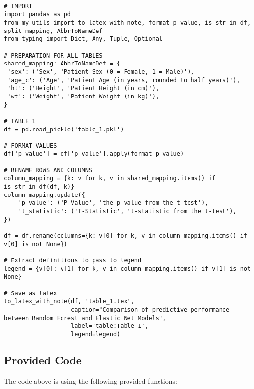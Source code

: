 \documentclass[11pt]{article}
\begin{document}
\begin{verbatim}

# IMPORT
import pandas as pd
from my_utils import to_latex_with_note, format_p_value, is_str_in_df, split_mapping, AbbrToNameDef
from typing import Dict, Any, Tuple, Optional

# PREPARATION FOR ALL TABLES
shared_mapping: AbbrToNameDef = {
 'sex': ('Sex', 'Patient Sex (0 = Female, 1 = Male)'),
 'age_c': ('Age', 'Patient Age (in years, rounded to half years)'),
 'ht': ('Height', 'Patient Height (in cm)'),
 'wt': ('Weight', 'Patient Weight (in kg)'),
}

# TABLE 1
df = pd.read_pickle('table_1.pkl')

# FORMAT VALUES
df['p_value'] = df['p_value'].apply(format_p_value)

# RENAME ROWS AND COLUMNS
column_mapping = {k: v for k, v in shared_mapping.items() if is_str_in_df(df, k)}
column_mapping.update({
    'p_value': ('P Value', 'the p-value from the t-test'),
    't_statistic': ('T-Statistic', 't-statistic from the t-test'),
})

df = df.rename(columns={k: v[0] for k, v in column_mapping.items() if v[0] is not None})

# Extract definitions to pass to legend
legend = {v[0]: v[1] for k, v in column_mapping.items() if v[1] is not None}

# Save as latex
to_latex_with_note(df, 'table_1.tex',
                   caption="Comparison of predictive performance between Random Forest and Elastic Net Models",
                   label='table:Table_1',
                   legend=legend)

\end{verbatim}

\subsection{Provided Code}
The code above is using the following provided functions:
\end{document}
